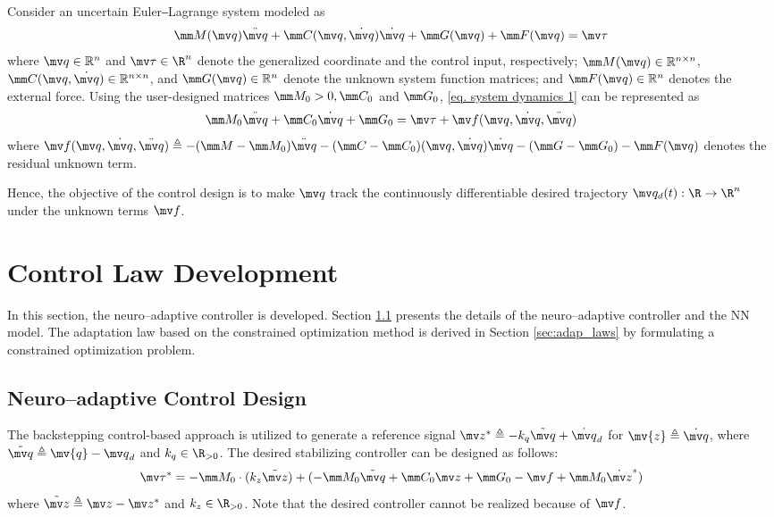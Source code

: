 \documentclass[letterpaper, 10 pt, conference]{ieeeconf}  %
\begin{document}
Consider an uncertain Euler‒Lagrange system modeled as
\begin{equation}
    \mm M(\mv q)\ddot {\mv q} + \mm C(\mv q,\dot {\mv q})\dot {\mv q} + \mm G(\mv q) + \mm F(\mv q) = \mv \tau
    \label{eq. system dynamics 1}
\end{equation}
where $\mv q\in \mathbb{R}^n$ and $\mv \tau\in\R^n$ denote the generalized coordinate and the control input, respectively; $\mm M(\mv q)\in\mathbb{R}^{n\times n}$, $\mm C(\mv q,\dot {\mv q})\in\mathbb{R}^{n\times n}$, and $\mm G(\mv q)\in\mathbb{R}^{n}$ denote the unknown system function matrices; and $\mm F(\mv q)\in\mathbb{R}^{n}$ denotes the external force.
Using the user-designed matrices $\mm M_0>0,\mm C_0$ and $\mm G_0$, \eqref{eq. system dynamics 1} can be represented as 
\begin{equation}
    \mm M_0\ddot {\mv q}+\mm C_0\dot {\mv q}+\mm G_0 = \mv \tau + \mv f(\mv q,\dot {\mv q},\ddot {\mv q})
    \label{eq. system dynamics 2}
\end{equation}
where $\mv f(\mv q,\dot {\mv q},\ddot {\mv q}) \triangleq -(\mm M-\mm M_0)\ddot {\mv q}-(\mm C-\mm C_0)(\mv q,\dot {\mv q})\dot {\mv q} -(\mm G-\mm G_0) -\mm F(\mv q)$ denotes the residual unknown term.

Hence, the objective of the control design is to make $\mv q$ track the continuously differentiable desired trajectory $\mv q_d(t):\R\to \R^n$ under the unknown terms $\mv f$.

\section{Control Law Development}\label{sec:ctrl design}

In this section, the neuro–adaptive controller is developed.
Section \ref{sec:ctrl dev} presents the details of the neuro–adaptive controller and the NN model.
The adaptation law based on the constrained optimization method is derived in Section \ref{sec:adap_laws} by formulating a constrained optimization problem.

\subsection{Neuro–adaptive Control Design} \label{sec:ctrl dev}

The backstepping control-based approach is utilized to generate a reference signal $\mv z^*\triangleq -{k_q}\tilde {\mv q}+\dot {\mv q}_d$ for $\mv {z}\triangleq \dot {\mv q}$, where $\tilde {\mv q}\triangleq \mv {q} - {\mv q}_d$ and $k_q\in\R_{>0}$.
The desired stabilizing controller can be designed as follows:
\begin{equation}
    \mv \tau^* = 
    -\mm M_0\cdot ({k_z}\tilde {\mv z})
    + 
        ( 
            -\mm M_0\tilde {\mv q}+\mm C_0{\mv z}+\mm G_0-\mv f+\mm M_0 \dot {\mv z}^*
        )
    \label{eq. desired control}
\end{equation}
where $\tilde {\mv z}\triangleq \mv z-\mv z^*$ and $k_z\in\R_{>0}$.
Note that the desired controller cannot be realized because of $\mv f$.
\end{document}
